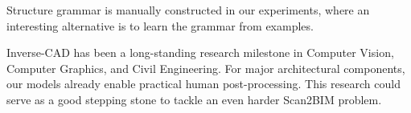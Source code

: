 Structure grammar is manually constructed in our experiments, where an
interesting alternative is to learn the grammar from examples.

 Inverse-CAD has been a
long-standing research milestone in Computer Vision, Computer Graphics,
and Civil Engineering.  For major architectural components, our models
already enable practical human post-processing. This research could
serve as a good stepping stone to tackle an even harder Scan2BIM
problem.

